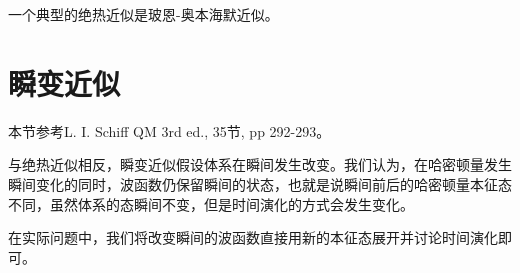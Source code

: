 一个典型的绝热近似是玻恩-奥本海默近似。

\section{瞬变近似}
\begin{framed}
本节参考L. I. Schiff QM 3rd ed., 35节, pp 292-293。
\end{framed}
与绝热近似相反，瞬变近似假设体系在瞬间发生改变。我们认为，在哈密顿量发生瞬间变化的同时，波函数仍保留瞬间的状态，也就是说瞬间前后的哈密顿量本征态不同，虽然体系的态瞬间不变，但是时间演化的方式会发生变化。

在实际问题中，我们将改变瞬间的波函数直接用新的本征态展开并讨论时间演化即可。